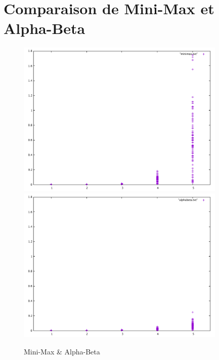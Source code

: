 \documentclass{report}
\begin{document}
\chapter{Comparaison de Mini-Max et Alpha-Beta}
\begin{figure}[ht]
\centering
\includegraphics[width=10cm,keepaspectratio]{minimax.pdf}
\includegraphics[width=10cm,keepaspectratio]{alphabeta.pdf}
\begin{center}
    \caption{Mini-Max \& Alpha-Beta}
\end{center}
\end{figure}
\end{document}
